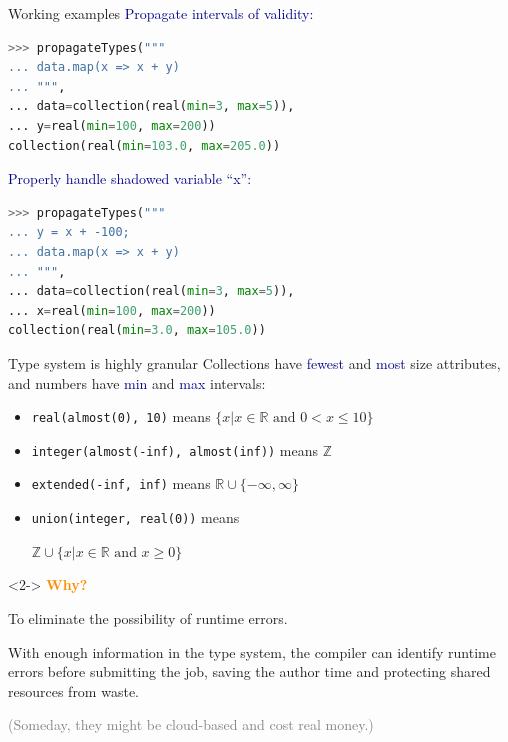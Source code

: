 \documentclass{beamer}
\begin{document}
\begin{frame}[fragile]{Working examples}
\vspace{0.3 cm}
\textcolor{darkblue}{Propagate intervals of validity:}
\begin{lstlisting}[language=python]
>>> propagateTypes("""
... data.map(x => x + y)
... """,
... data=collection(real(min=3, max=5)),
... y=real(min=100, max=200))
collection(real(min=103.0, max=205.0))
\end{lstlisting}

\vfill
\textcolor{darkblue}{Properly handle shadowed variable ``x'':}
\begin{lstlisting}[language=python]
>>> propagateTypes("""
... y = x + -100;
... data.map(x => x + y)
... """,
... data=collection(real(min=3, max=5)),
... x=real(min=100, max=200))
collection(real(min=3.0, max=105.0))
\end{lstlisting}
\end{frame}

\begin{frame}{Type system is highly granular}
\vspace{0.5 cm}
Collections have \textcolor{darkblue}{fewest} and \textcolor{darkblue}{most} size attributes, and numbers have \textcolor{darkblue}{min} and \textcolor{darkblue}{max} intervals:
\begin{itemize}
\item {\tt real(almost(0), 10)} means $\{x | x \in \mathbb{R}\mbox{ and } 0 < x \le 10\}$
\item {\tt integer(almost(-inf), almost(inf))} means $\mathbb{Z}$
\item {\tt extended(-inf, inf)} means $\mathbb{R} \cup \{-\infty, \infty\}$
\item {\tt union(integer, real(0))} means

\hfill $\mathbb{Z} \cup \{x | x \in \mathbb{R}\mbox{ and } x \ge 0\}$
\end{itemize}

\vfill
\begin{uncoverenv}<2->
\textcolor{darkorange}{\bf Why?}

\vspace{0.2 cm}
To eliminate the possibility of runtime errors.

\vspace{0.2 cm}
With enough information in the type system, the compiler can identify runtime errors before submitting the job, saving the author time and protecting shared resources from waste.

\vspace{0.2 cm}
\textcolor{gray}{(Someday, they might be cloud-based and cost real money.)}
\end{uncoverenv}
\end{frame}
\end{document}
